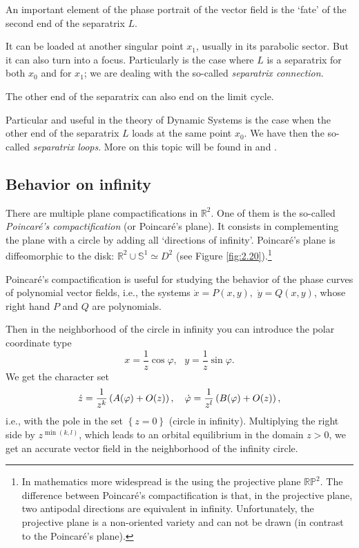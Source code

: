 \begin{remark}
	An important element of the phase portrait of the vector field is the `fate' of the second end of the separatrix $L$.
	
	It can be loaded at another singular point $x_1$, usually in its parabolic sector. But it can also turn into a focus. Particularly is the case where $L$ is a separatrix for both $x_0$ and for $x_1$; we are dealing with the so-called \textit{separatrix connection}.
	
	The other end of the separatrix can also end on the limit cycle.
	
	Particular and useful in the theory of Dynamic Systems is the case when the other end of the separatrix $L$ loads at the same point $x_0$. We have then the so-called \textit{separatrix loops}. More on this topic will be found in \cite{ALG1} and \cite{ALG2}.
\end{remark}

\subsection{Behavior on infinity}

There are multiple plane compactifications in $\mathbb{R}^{2}$. One of them is the so-called \textit{Poincaré's compactification} (or Poincaré's plane). It consists in complementing the plane with a circle by adding all `directions of infinity'. Poincaré's plane is diffeomorphic to the disk: $\mathbb{R}^{2}\cup \mathbb{S}^{1}\simeq D^{2}$ (see Figure \ref{fig:2.20}).\footnote{In mathematics more widespread is the using the projective plane $\mathbb{RP}^{2}$. The difference between Poincaré's compactification is that, in the projective plane, two antipodal directions are equivalent in infinity. Unfortunately, the projective plane is a non-oriented variety and can not be drawn (in contrast to the Poincaré's plane).}

Poincaré's compactification is useful for studying the behavior of the phase curves of polynomial vector fields, i.e., the systems $\dot{x}=P(x,y),$ $\dot{y}=Q(x,y)$, whose right hand $P$ and $Q$ are polynomials.

Then in the neighborhood of the circle in infinity you can introduce the polar coordinate type
$$
x=\frac{1}{z}\cos \varphi ,\text{ \ \ }y=\frac{1}{z}\sin \varphi .
$$
We get the character set
$$
\dot{z}=\frac{1}{z^{k}}\left( A(\varphi )+O(z)\right) ,\text{ \ \ }\dot{%
	\varphi}=\frac{1}{z^{l}}\left( B(\varphi )+O(z)\right) ,
$$
i.e., with the pole in the set $\left\{ z=0\right\} $ (circle in infinity). Multiplying the right side by $z^{\min \left( k,l\right)}$, which leads to an orbital equilibrium in the domain $z>0$, we get an accurate vector field in the neighborhood of the infinity circle.

